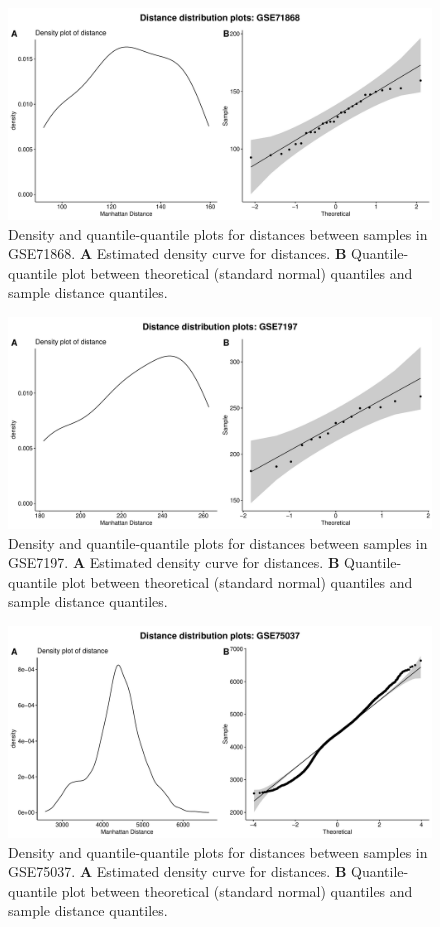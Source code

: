 \documentclass[10pt,letterpaper]{article}\usepackage[]{graphicx}\usepackage[]{color}
\begin{document}
\begin{figure}[H]
	\includegraphics[width=\textwidth]{manhattan-distance_hist_GSE71868.pdf}
	\caption{Density and quantile-quantile plots for distances between samples in GSE71868. \textbf{A} Estimated density curve for distances. \textbf{B} Quantile-quantile plot between theoretical (standard normal) quantiles and sample distance quantiles.}
\end{figure}

\begin{figure}[H]
	\includegraphics[width=\textwidth]{manhattan-distance_hist_GSE7197.pdf}
	\caption{Density and quantile-quantile plots for distances between samples in GSE7197. \textbf{A} Estimated density curve for distances. \textbf{B} Quantile-quantile plot between theoretical (standard normal) quantiles and sample distance quantiles.}
\end{figure}

\begin{figure}[H]
	\includegraphics[width=\textwidth]{manhattan-distance_hist_GSE75037.pdf}
	\caption{Density and quantile-quantile plots for distances between samples in GSE75037. \textbf{A} Estimated density curve for distances. \textbf{B} Quantile-quantile plot between theoretical (standard normal) quantiles and sample distance quantiles.}
\end{figure}
\end{document}
